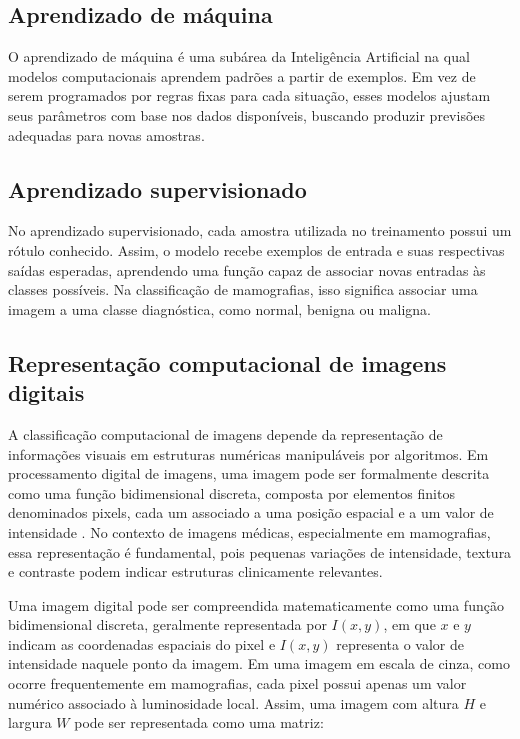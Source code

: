 \documentclass[
    12pt,
    openright,
    oneside,
    a4paper,
    english,
    brazil
]{abntex2}
\begin{document}
\subsection{Aprendizado de máquina}

O aprendizado de máquina é uma subárea da Inteligência Artificial na qual modelos computacionais aprendem padrões a partir de exemplos. Em vez de serem programados por regras fixas para cada situação, esses modelos ajustam seus parâmetros com base nos dados disponíveis, buscando produzir previsões adequadas para novas amostras.

\subsection{Aprendizado supervisionado}

No aprendizado supervisionado, cada amostra utilizada no treinamento possui um rótulo conhecido. Assim, o modelo recebe exemplos de entrada e suas respectivas saídas esperadas, aprendendo uma função capaz de associar novas entradas às classes possíveis. Na classificação de mamografias, isso significa associar uma imagem a uma classe diagnóstica, como normal, benigna ou maligna.

\subsection{Representação computacional de imagens digitais}

A classificação computacional de imagens depende da representação de informações visuais em estruturas numéricas manipuláveis por algoritmos. Em processamento digital de imagens, uma imagem pode ser formalmente descrita como uma função bidimensional discreta, composta por elementos finitos denominados pixels, cada um associado a uma posição espacial e a um valor de intensidade \cite{gonzalez2008digital}. No contexto de imagens médicas, especialmente em mamografias, essa representação é fundamental, pois pequenas variações de intensidade, textura e contraste podem indicar estruturas clinicamente relevantes.

Uma imagem digital pode ser compreendida matematicamente como uma função bidimensional discreta, geralmente representada por \(I(x,y)\), em que \(x\) e \(y\) indicam as coordenadas espaciais do pixel e \(I(x,y)\) representa o valor de intensidade naquele ponto da imagem. Em uma imagem em escala de cinza, como ocorre frequentemente em mamografias, cada pixel possui apenas um valor numérico associado à luminosidade local. Assim, uma imagem com altura \(H\) e largura \(W\) pode ser representada como uma matriz:
\end{document}
